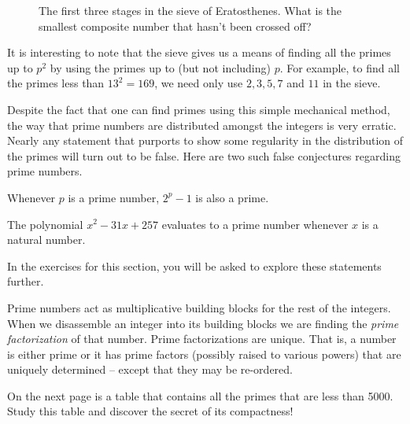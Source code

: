 \begin{figure}[!hbtp]

\caption[The sieve of Eratosthenes.]{The first three stages in the %
sieve of Eratosthenes.  What is the smallest composite number that %
hasn't been crossed off?}
\label{fig:sieve} 
\end{figure}

It is interesting to note that the sieve gives us a means of finding
all the primes up to $p^2$ by using the primes up to (but not
including) $p$.  For
example, to find all the primes less than $13^2 = 169$, we need only
use $2, 3, 5, 7$ and $11$ in the sieve.

Despite the fact that one can find primes using this simple 
mechanical method, the way that prime numbers are distributed
amongst the integers is very erratic.  Nearly any statement that
purports to show some regularity in the distribution of the 
primes will turn out to be false.  Here are two such false
conjectures regarding prime numbers.

\begin{conj} \label{conj:ferm}
Whenever $p$ is a prime number, $2^p-1$ is also a prime.
\end{conj}

\begin{conj} \label{conj:poly}
The polynomial $x^2-31x+257$ evaluates to a prime number
whenever $x$ is a natural number.
\end{conj}

In the exercises for this section, you will be asked to
explore these statements further.  

Prime numbers act as multiplicative building blocks for the rest of
the integers.  When we disassemble an integer into its building blocks
we are finding the \emph{prime factorization} 
of that number.  Prime
factorizations are unique.  That is, a number is either prime or it
has prime factors (possibly raised to various powers) that are
uniquely determined -- except that they may be re-ordered.

On the next page
is a table that contains all the primes that are less than 5000.
Study this table and discover the secret of its compactness!

\newpage



